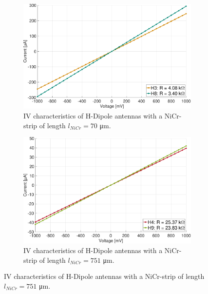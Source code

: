 \begin{figure}[ht]
    \begin{subfigure}[b]{0.49\textwidth}
        \centering
        \includegraphics[width=\textwidth]{figures/IV/IV_H3_H8.pdf}
        \caption{IV characteristics of H-Dipole antennas with a NiCr-strip of length $l_{NiCr} = 70$ \si{\micro \meter}.}
        \label{fig:sub3}
    \end{subfigure}
    \hfill
    \begin{subfigure}[b]{0.49\textwidth}
        \centering
        \includegraphics[width=\textwidth]{figures/IV/IV_H4_H9.pdf}
        \caption{IV characteristics of H-Dipole antennas with a NiCr-strip of length $l_{NiCr} = 751$ \si{\micro \meter}.}
        \label{fig:sub4}
    \end{subfigure}
    
    \vspace{1em} %


\end{figure}
